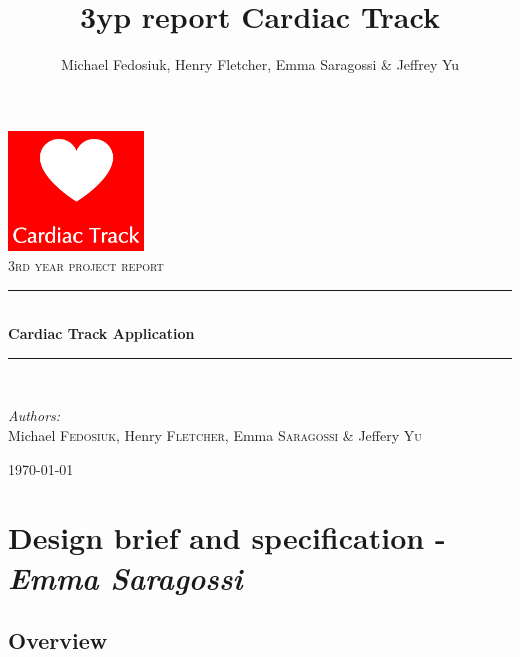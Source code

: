 \documentclass[11pt]{article}
\author{Michael Fedosiuk, Henry Fletcher, Emma Saragossi & Jeffrey Yu}
\title{3yp report Cardiac Track}
\newcommand{\HRule}{\rule{\linewidth}{0.5mm}}
\begin{document}
\begin{titlepage}
\begin{center}

\includegraphics[width=0.27\textwidth]{titleimg.png}~\\[1cm]

\textsc{\Large 3rd year project report}\\[0.5cm]

\HRule \\[0.4cm]
{ \huge \bfseries Cardiac Track Application \\[0.4cm] }

\HRule \\[1.5cm]

\begin{minipage}{0.8\textwidth}
\begin{flushleft} \large
\emph{Authors:}\\
Michael \textsc{Fedosiuk}, Henry \textsc{Fletcher}, Emma \textsc{Saragossi} \& Jeffery \textsc{Yu}
\\
\end{flushleft}
\end{minipage}

\vfill

{\large \today}

\end{center}
\end{titlepage}

\tableofcontents

\section{Design brief and specification - \textit{Emma Saragossi}}
\subsection{Overview}
\end{document}
